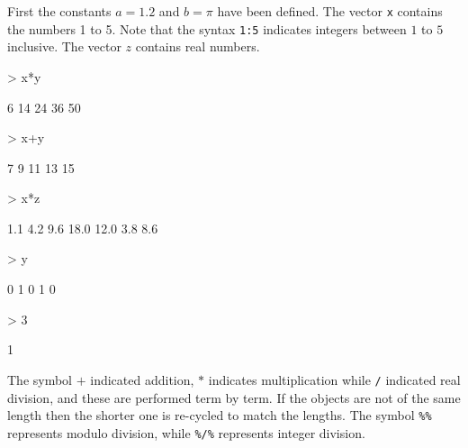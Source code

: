 \documentclass[12pt,A4,makeidx]{article}
\begin{document}
First the constants $a=1.2$ and $b=\pi$ have been defined. The vector \texttt{x} contains the numbers 1 to 5. 
Note that the syntax \texttt{1:5} indicates integers between
$1$ to $5$ inclusive. The vector $z$ contains real numbers.
\begin{Schunk}
\begin{Sinput}
> x*y
\end{Sinput}
\begin{Soutput}
[1]  6 14 24 36 50
\end{Soutput}
\begin{Sinput}
> x+y
\end{Sinput}
\begin{Soutput}
[1]  7  9 11 13 15
\end{Soutput}
\begin{Sinput}
> x*z
\end{Sinput}
\begin{Soutput}
[1]  1.1  4.2  9.6 18.0 12.0  3.8  8.6
\end{Soutput}
\begin{Sinput}
> y%%2
\end{Sinput}
\begin{Soutput}
[1] 0 1 0 1 0
\end{Soutput}
\begin{Sinput}
> 3%/%2
\end{Sinput}
\begin{Soutput}
[1] 1
\end{Soutput}
\end{Schunk}
The symbol $+$ indicated addition, $*$ indicates multiplication while \texttt{/} indicated real division, 
and these are performed term by term. 
If the objects are not of the same length then the shorter one is re-cycled to match the lengths. The symbol \texttt{\%\%}
represents modulo division, while \texttt{\%/\%} represents integer division.
\end{document}
